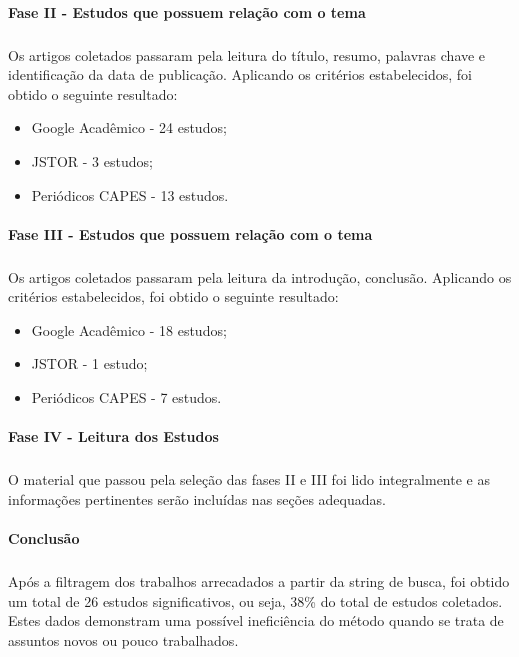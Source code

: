 \paragraph{Fase II - Estudos que possuem relação com o tema}
\subparagraph{}
\quad Os artigos coletados passaram pela leitura do título, resumo, palavras chave e identificação da data de publicação.
Aplicando os critérios estabelecidos, foi obtido o seguinte resultado:
\begin{itemize}
  \item Google Acadêmico - 24 estudos;
  \item JSTOR - 3 estudos;
  \item Periódicos CAPES - 13 estudos.
\end{itemize}
\paragraph{Fase III - Estudos que possuem relação com o tema}
\subparagraph{}
\quad Os artigos coletados passaram pela leitura da introdução, conclusão.
Aplicando os critérios estabelecidos, foi obtido o seguinte resultado:
\begin{itemize}
  \item Google Acadêmico - 18 estudos;
  \item JSTOR - 1 estudo;
  \item Periódicos CAPES - 7 estudos.
\end{itemize}
\paragraph{Fase IV - Leitura dos Estudos}
\subparagraph{}
\quad O material que passou pela seleção das fases II e III foi lido integralmente e as
informações pertinentes serão incluídas nas seções adequadas.
\paragraph{Conclusão}
\subparagraph{}
\quad Após a filtragem dos trabalhos arrecadados a partir da string de busca, foi obtido um total de 26 estudos significativos,
ou seja, 38\% do total de estudos coletados. Estes dados demonstram uma possível ineficiência do método quando se trata de assuntos
novos ou pouco trabalhados.


